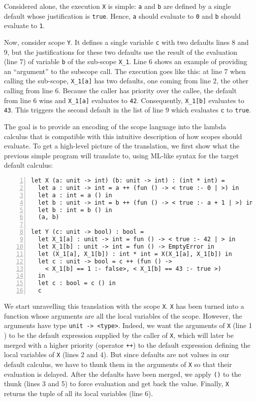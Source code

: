 \documentclass[11pt,a4paper]{article}
\begin{document}
Considered alone, the execution \Verb+X+ is simple: \Verb+a+ and \Verb+b+ are defined by 
a single default whose justification is \Verb+true+. Hence, \Verb+a+ should evaluate 
to \Verb+0+ and \Verb+b+ should evaluate to \Verb+1+.

Now, consider scope \Verb+Y+. It defines a single variable \Verb+c+ with two defaults 
lines 8 and 9, but the justifications for these two defaults use the result of 
the evaluation (line 7) of variable \Verb+b+ of the sub-scope \Verb+X_1+. 
Line 6 shows an example of providing an \enquote{argument} to the subscope call.
The execution goes like this: at line 7 when calling the sub-scope,
\Verb+X_1[a]+ has two defaults, one coming from line 2, the other calling 
from line 6. Because the caller has priority over the callee, the default from line 
6 wins and \Verb+X_1[a]+ evaluates to \Verb+42+. Consequently,
\Verb+X_1[b]+ evaluates to \Verb+43+.
This triggers the second default in the list of line 9 which evaluates \Verb+c+ to \Verb+true+. 

The goal is to provide an encoding of the scope language 
into the lambda calculus that is compatible with this intuitive description 
of how scopes should evaluate. To get a high-level 
picture of the translation, we first show what the previous simple program will translate 
to, using ML-like syntax for the target default calculus:
\begin{Verbatim}[frame=lines,label=Simple default program, numbers=left, framesep=10pt, samepage=true]
let X (a: unit -> int) (b: unit -> int) : (int * int) =
  let a : unit -> int = a ++ (fun () -> < true :- 0 | >) in
  let a : int = a () in  
  let b : unit -> int = b ++ (fun () -> < true :- a + 1 | >) in 
  let b : int = b () in
  (a, b)

let Y (c: unit -> bool) : bool = 
  let X_1[a] : unit -> int = fun () -> < true :- 42 | > in
  let X_1[b] : unit -> int = fun () -> EmptyError in 
  let (X_1[a], X_1[b]) : int * int = X(X_1[a], X_1[b]) in 
  let c : unit -> bool = c ++ (fun () -> 
    < X_1[b] == 1 :- false>, < X_1[b] == 43 :- true >)
  in 
  let c : bool = c () in 
  c 
\end{Verbatim}

We start unravelling this translation with the scope \Verb+X+. \Verb+X+ has 
been turned into a function whose arguments are all the local variables of the 
scope. However, the arguments have type \Verb+unit -> <type>+. Indeed, we want the 
arguments of \Verb+X+ (line 1 ) to be the default expression supplied by the caller of
\Verb+X+, which will later be merged with a higher priority (operator \Verb|++|) to the default 
expression defining the local variables of \Verb+X+ (lines 2 and 4). But since defaults are not 
values in our default calculus, we have to thunk them in the arguments of \Verb|X| 
so that their evaluation is delayed. After the defaults have been merged, we apply 
\Verb+()+ to the thunk (lines 3 and 5) to force evaluation and get back the value.
Finally, \Verb+X+ returns the tuple of all its local variables (line 6).
\end{document}
